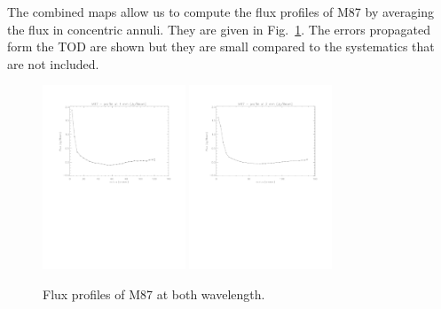 \documentclass[a4paper]{article}
\begin{document}
The combined maps allow us to compute the flux profiles of M87 by averaging the flux in concentric annuli. They are given in Fig.~\ref{fig:M87_profile}. The errors propagated form the TOD are shown but they are small compared to the systematics that are not included.
\begin{figure}
\centering
\includegraphics[height=5.5cm, trim=2cm 13cm 2cm 2cm, clip=true]{Figure/M87_profile_1mm}
\includegraphics[height=5.5cm, trim=2cm 13cm 2cm 2cm, clip=true]{Figure/M87_profile_2mm}
\caption{Flux profiles of M87 at both wavelength.}
\label{fig:M87_profile}
\end{figure}
\end{document}
